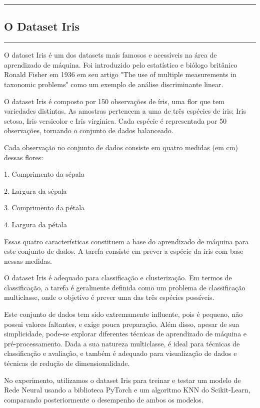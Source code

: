 {\color{gray}\hrule}
\begin{center}
\section{O Dataset Iris}
\end{center}
{\color{gray}\hrule}
\begin{multicols}{2}

    O dataset Iris é um dos datasets mais famosos e acessíveis na área de aprendizado de máquina. Foi introduzido pelo estatístico e biólogo britânico Ronald Fisher em 1936 em seu artigo "The use of multiple measurements in taxonomic problems" como um exemplo de análise discriminante linear.
    
    O dataset Iris é composto por 150 observações de íris, uma flor que tem variedades distintas. As amostras pertencem a uma de três espécies de íris: Iris setosa, Iris versicolor e Iris virginica. Cada espécie é representada por 50 observações, tornando o conjunto de dados balanceado.
    
    Cada observação no conjunto de dados consiste em quatro medidas (em cm) dessas flores: 
    
    1. Comprimento da sépala
    
    2. Largura da sépala

    3. Comprimento da pétala

    4. Largura da pétala
    
    Essas quatro características constituem a base do aprendizado de máquina para este conjunto de dados. A tarefa consiste em prever a espécie da íris com base nessas medidas.
    
    O dataset Iris é adequado para classificação e clusterização. Em termos de classificação, a tarefa é geralmente definida como um problema de classificação multiclasse, onde o objetivo é prever uma das três espécies possíveis. 
    
    Este conjunto de dados tem sido extremamente influente, pois é pequeno, não possui valores faltantes, e exige pouca preparação. Além disso, apesar de sua simplicidade, pode-se explorar diferentes técnicas de aprendizado de máquina e pré-processamento. Dada a sua natureza multiclasse, é ideal para técnicas de classificação e avaliação, e também é adequado para visualização de dados e técnicas de redução de dimensionalidade.
    
    No experimento, utilizamos o dataset Iris para treinar e testar um modelo de Rede Neural usando a biblioteca PyTorch e um algoritmo KNN do Scikit-Learn, comparando posteriormente o desempenho de ambos os modelos.
\end{multicols}